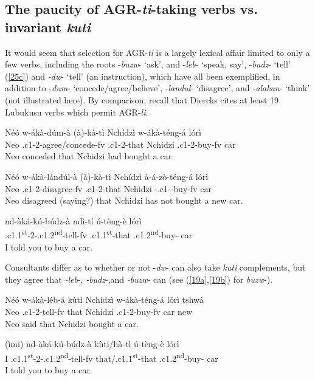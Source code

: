 \documentclass[output=paper,
modfonts
]{langscibook}
\begin{document}
\subsection{The paucity of AGR-\textit{ti}-taking verbs vs. invariant \textit{kuti}}

It would seem that selection for AGR-\textit{ti} is a largely lexical affair limited to only a few verbs, including the roots -\textit{buzw}- `ask', and -\textit{leb}- `speak, say', -\textit{budz}- `tell' (\ref{25c})  and \textit{-dw}- `tell' (an instruction), which have all been exemplified, in addition to -\textit{dum}- `concede/agree/believe', -\textit{landul}- `disagree', and  \textit{-alakan}- `think' (not illustrated here). By comparison, recall that Diercks cites at least 19 Lubukusu verbs which permit AGR-\textit{li}.

\ea
\ea \gll Néó  w-ákà-dúm-à (à)-kà-tì Nchídzì  w-ákà-téng-á lórì\\
	Neo .c1-2-agree/concede-fv .c1-2-that Nchidzi
    .c1-2-buy-fv car\\
	\glt Neo conceded that Nchidzi had bought a car.

\ex \gll Néó w-ákà-lándúl-à (à)-kà-tì Nchídzì à-á-zò-téng-á lórì \\
	Neo .c1-2-disagree-fv .c1-2-that Nchidzi -.c1--buy-fv car \\
	\glt Neo disagreed (saying?) that Nchidzi has not bought a new car.

\ex \label{25c} \gll nd-àká-kú-búdz-à ndì-tí ú-tèng-è lórì\\
	.c1.1\textsuperscript{st}-2-.c1.2\textsuperscript{nd}-tell-fv .c1.1\textsuperscript{st}-that
    .c1.2\textsuperscript{nd}-buy- car\\
	\glt I told you to buy a car. \z\z

Consultants differ as to whether or not -\textit{dw}- can also take \textit{kuti} complements, but they agree that \textit{-leb}-, \textit{-budz}-,and \textit{-buzw}- can (see (\ref{19a},\ref{19b}) for \textit{buzw}-).

\ea
\ea \gll Néó w-ákà-léb-á kùtì  Nchídzì w-ákà-téng-á lórì tshwá\\
	Neo	.c1-2-tell-fv that Nchidzi .c1-2-buy-fv car new\\
	\glt Neo said that Nchidzi bought a car.

\ex \gll (ìmì) nd-àká-kú-búdz-à kùti/hà-tì ú-tèng-è lórì\\
      I .c1.1\textsuperscript{st}-2-.c1.2\textsuperscript{nd}-tell-fv that/.c1.1\textsuperscript{st}-that .c1.2\textsuperscript{nd}-buy- car\\
	\glt I told you to buy a car. \z\z
\end{document}
